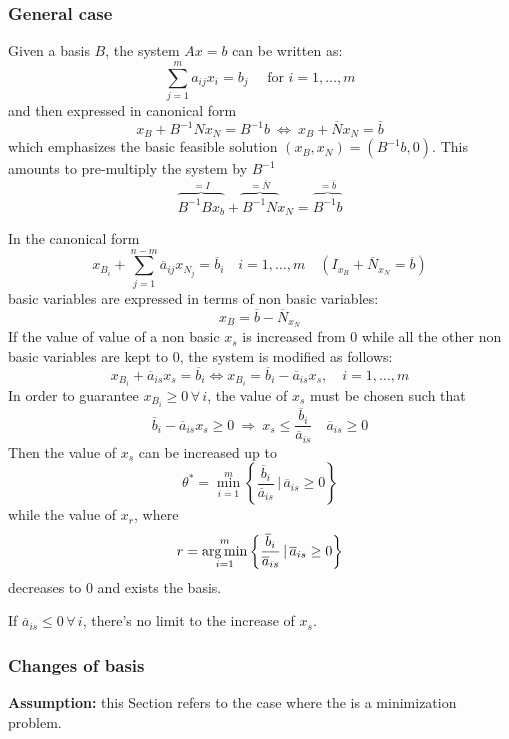 \documentclass[english]{article}
\begin{document}
\subsubsection{General case}

Given a basis \(B\), the system \(Ax = b\) can be written as:
\[ \displaystyle \sum_{j=1}^m a_{ij} x_i = b_j \quad \text{ for } i = 1, \ldots, m\]
and then expressed in canonical form
\[ x_B + B^{-1} N x_N = B^{-1} b \ \Leftrightarrow \ x_B + \overline{N} x_N = \overline{b} \]
which emphasizes the basic feasible solution \(\left( x_B, x_N \right) = \left( B^{-1} b, 0 \right)\).
This amounts to pre-multiply the system by \(B^{-1}\)
\[ \overbrace{B^{-1} B x_b}^{=I} + \overbrace{B^{-1} N}^{= \overline{N}} x_N = \overbrace{B^{-1} b}^{= \overline{b}} \]

\bigskip
In the canonical form
\[ x_{B_i} + \displaystyle \sum_{j=1}^{n-m} \overline{a}_{ij} x_{N_j} = \overline{b}_i \quad i = 1, \ldots, m \quad (I_{x_B} + \overline{N}_{x_N} = \overline{b}) \]
basic variables are expressed in terms of non basic variables:
\[ x_B = \overline{b} - \overline{N}_{x_N} \]
If the value of value of a non basic \(x_s\) is increased from \(0\) while all the other non basic variables are kept to \(0\), the system is modified as follows:
\[ x_{B_i} + \overline{a}_{is} x_s = \overline{b}_i \Leftrightarrow x_{B_i} = \overline{b}_i - \overline{a}_{is} x_s, \quad i = 1, \ldots, m \]
In order to guarantee \(x_{B_i} \geq 0 \, \forall \, i\), the value of \(x_s\) must be chosen such that
\[ \overline{b}_i - \overline{a}_{is} x_s \geq 0 \ \Rightarrow \ x_s \leq \dfrac{\overline{b}_i}{\overline{a}_{is}} \quad \overline{a}_{is} \geq 0 \]
Then the value of \(x_s\) can be increased up to
\[ \theta^\ast = \min_{i=1}^m \left\{ \dfrac{\overline{b}_i}{\overline{a}_{is}} \, | \, \overline{a}_{is} \geq 0 \right\} \]
while the value of \(x_r\), where
\[ r = \operatorname*{arg\,min}_{i=1}^m \left\{ \dfrac{\overline{b}_i}{\overline{a}_{is}} \, | \, \overline{a}_{is} \geq 0 \right\} \]
decreases to \(0\) and exists the basis.

\bigskip
If \(\overline{a}_{is} \leq 0 \, \forall \, i\), there's  no limit to the increase of \(x_s\).

\subsubsection{Changes of basis}

\textbf{Assumption:} this Section refers to the case where the \LP is a minimization problem.
\end{document}
